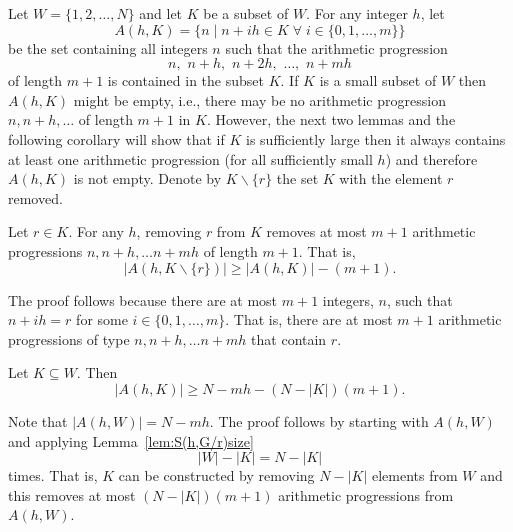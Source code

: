 \documentclass[journal]{IEEEtran}
\begin{document}
 
Let $W = \{1,2,\dots, N\}$ and let $K$ be a subset of $W$.  For any integer $h$, let
\begin{equation} \label{eq:S(h,G)def} 
A(h,K) = \big\{ n \mid n + ih \in K \;\forall\; i \in \{0,1,\dots,m\} \big\}
\end{equation}
be the set containing all integers $n$ such that the arithmetic progression
\[
n, \,\, n + h, \,\, n + 2h, \,\, \dots, \,\, n + mh
\]
of length $m+1$ is contained in the subset $K$.  If $K$ is a small subset of $W$ then $A(h,K)$ might be empty, i.e., there may be no arithmetic progression $n, n+h, \dots$ of length $m+1$ in $K$. However, the next two lemmas and the following corollary will show that if $K$ is sufficiently large then it always contains at least one arithmetic progression (for all sufficiently small $h$) and therefore $A(h,K)$ is not empty. Denote by $K \backslash \{r\}$ the set $K$ with the element $r$ removed.

\begin{lemma} \label{lem:S(h,G/r)size}
Let $r \in K$.  For any $h$, removing $r$ from $K$ removes at most $m+1$ arithmetic progressions $n, n+h, \dots n+mh$ of length $m+1$.  That is,
\[
|A(h,K \backslash \{r\})| \geq |A(h,K)| - (m+1).
\]
\end{lemma}
\begin{IEEEproof}
The proof follows because there are at most $m+1$ integers, $n$, such that $n+ih = r$ for some $i \in \{0,1,\dots,m\}$.  That is, there are at most $m+1$ arithmetic progressions of type $n, n+h, \dots n+mh$ that contain $r$.
\end{IEEEproof}

 \begin{lemma} \label{lem:S(h,K)size}
 Let $K \subseteq W$.  Then 
\[
|A(h,K)| \geq N - mh - (N - |K|)(m+1).
\]
 \end{lemma}
 \begin{IEEEproof}
 Note that $|A(h,W)| = N - mh$.  The proof follows by starting with $A(h,W)$ and applying Lemma~\ref{lem:S(h,G/r)size} 
\[
|W|-|K| = N - |K|
\] 
times. That is, $K$ can be constructed by removing $N - |K|$ elements from $W$ and this removes at most $(N - |K|)(m+1)$ arithmetic progressions from $A(h,W)$.
 \end{IEEEproof}
 
\end{document}
